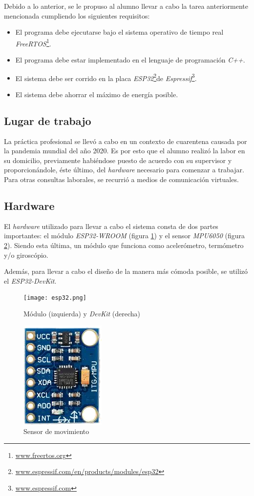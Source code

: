 \documentclass{article}
\newcommand{ \fnfreertos }{\footnote{\url{www.freertos.org}}}
\newcommand{ \fnespressif }{\footnote{\url{www.espressif.com}}}
\newcommand{ \fnesp }{\footnote{\url{www.espressif.com/en/products/modules/esp32}}}
\begin{document}
    Debido a lo anterior, se le propuso al alumno llevar a cabo la tarea 
    anteriormente mencionada cumpliendo los siguientes requisitos:

    \begin{itemize}
        \item El programa debe ejecutarse bajo el sistema operativo de tiempo
        real \emph{FreeRTOS}\fnfreertos.
        \item El programa debe estar implementado en el lenguaje de 
        programación \emph{C++}.
        \item El sistema debe ser corrido en la placa \emph{ESP32}\fnesp de 
        \emph{Espressif}\fnespressif.
        \item El sistema debe ahorrar el máximo de energía posible.
    \end{itemize}
    
    \subsection{Lugar de trabajo}
    La práctica profesional se llevó a cabo en un contexto de cuarentena causada 
    por la pandemia mundial del año 2020. Es por esto que el alumno realizó la 
    labor en su domicilio, previamente habiéndose puesto de acuerdo con su 
    supervisor y proporcionándole, éste último, del \emph{hardware} necesario 
    para comenzar a trabajar. Para otras consultas laborales, se recurrió a 
    medios de comunicación virtuales.

    \subsection{Hardware}
    El \emph{hardware} utilizado para llevar a cabo el sistema consta de dos 
    partes importantes: el módulo \emph{ESP32-WROOM} (figura \ref{fig:esp32})
    y el sensor \emph{MPU6050} (figura \ref{fig:mpu}). Siendo esta última, 
    un módulo que funciona como acelerómetro, termómetro y/o giroscópio. \par

    Además, para llevar a cabo el diseño de la manera más cómoda posible, se
    utilizó el \emph{ESP32-DevKit}.

    \begin{figure}[h]
        \texttt{[image: esp32.png]}
        \caption{Módulo (izquierda) y \emph{DevKit} (derecha)}
        \label{fig:esp32}
    \end{figure} 

    \begin{figure}[h]
        \includegraphics[width=0.3 \textwidth, center]{mpu.png}
        \caption{Sensor de movimiento}
        \label{fig:mpu}
    \end{figure} 
\end{document}
